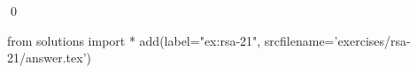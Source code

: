 
\begin{ex} 
  \label{ex:rsa-21}
  
  \qed
\end{ex} 
\begin{python0}
from solutions import *
add(label="ex:rsa-21",
    srcfilename='exercises/rsa-21/answer.tex') 
\end{python0}
